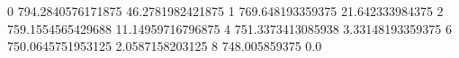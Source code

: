 0 794.2840576171875 46.2781982421875
1 769.648193359375 21.642333984375
2 759.1554565429688 11.14959716796875
4 751.3373413085938 3.33148193359375
6 750.0645751953125 2.0587158203125
8 748.005859375 0.0
